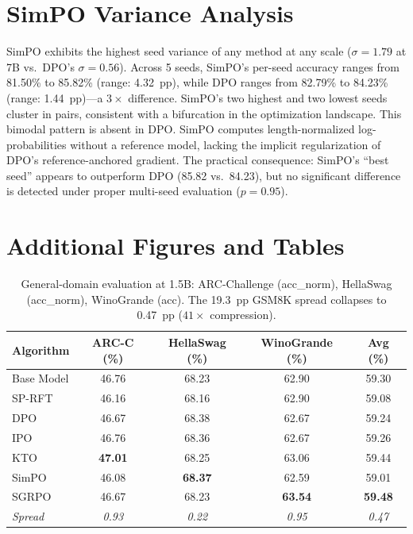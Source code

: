 \documentclass{article}
\newcommand{\sprft}{SP-RFT}
\begin{document}
\section{SimPO Variance Analysis}
\label{app:simpo_variance}

SimPO exhibits the highest seed variance of any method at any scale ($\sigma = 1.79$ at 7B vs.\ DPO's $\sigma = 0.56$). Across 5 seeds, SimPO's per-seed accuracy ranges from 81.50\% to 85.82\% (range: 4.32~pp), while DPO ranges from 82.79\% to 84.23\% (range: 1.44~pp)---a $3\times$ difference. SimPO's two highest and two lowest seeds cluster in pairs, consistent with a bifurcation in the optimization landscape. This bimodal pattern is absent in DPO. SimPO computes length-normalized log-probabilities without a reference model, lacking the implicit regularization of DPO's reference-anchored gradient. The practical consequence: SimPO's ``best seed'' appears to outperform DPO (85.82 vs.\ 84.23), but no significant difference is detected under proper multi-seed evaluation ($p = 0.95$).

\section{Additional Figures and Tables}
\label{app:figures}

\begin{table}[ht]
\centering
\caption{General-domain evaluation at 1.5B: ARC-Challenge (acc\_norm), HellaSwag (acc\_norm), WinoGrande (acc). The 19.3~pp GSM8K spread collapses to 0.47~pp ($41\times$ compression).}
\label{tab:general_domain_15b}
\small
\begin{tabular}{@{}lcccc@{}}
\toprule
\textbf{Algorithm} & \textbf{ARC-C (\%)} & \textbf{HellaSwag (\%)} & \textbf{WinoGrande (\%)} & \textbf{Avg (\%)} \\
\midrule
Base Model & 46.76 & 68.23 & 62.90 & 59.30 \\
\midrule
\sprft{} & 46.16 & 68.16 & 62.90 & 59.08 \\
DPO & 46.67 & 68.38 & 62.67 & 59.24 \\
IPO & 46.76 & 68.36 & 62.67 & 59.26 \\
KTO & \textbf{47.01} & 68.25 & 63.06 & 59.44 \\
SimPO & 46.08 & \textbf{68.37} & 62.59 & 59.01 \\
SGRPO & 46.67 & 68.23 & \textbf{63.54} & \textbf{59.48} \\
\midrule
\textit{Spread} & \textit{0.93} & \textit{0.22} & \textit{0.95} & \textit{0.47} \\
\bottomrule
\end{tabular}
\end{table}
\end{document}
